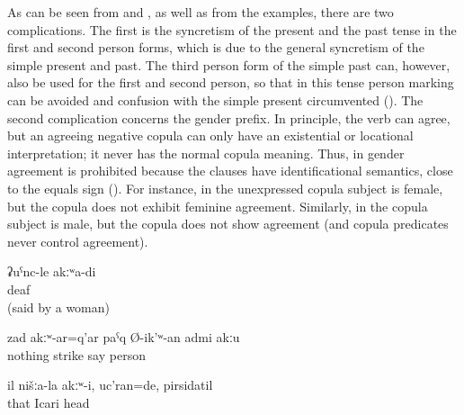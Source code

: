 As can be seen from  and , as well as from the examples, there are two complications. The first is the syncretism of the present and the past tense in the first and second person forms, which is due to the general syncretism of the simple present and past. The third person form of the simple past can, however, also be used for the first and second person, so that in this tense person marking can be avoided and confusion with the simple present circumvented (). The second complication concerns the gender prefix. In principle, the verb can agree, but an agreeing negative copula can only have an existential or locational interpretation; it never has the normal copula meaning. Thus, in  gender agreement is prohibited because the clauses have identificational semantics, close to the equals sign (\tit{=}). For instance, in  the unexpressed copula subject is female, but the copula does not exhibit feminine agreement. Similarly, in  the copula subject is male, but the copula does not show agreement (and copula predicates never control agreement).
%
\begin{exe}
	\ex	\label{ex:I am not deaf}
	\gll	ʡuˁnc-le	akːʷa-di\\
		deaf	\\
	\glt	{} (said by a woman)

	\ex	\label{ex:He is not the person who beats without anything}
	\gll	zad	akːʷ-ar=q'ar	paˁq	Ø-ik'ʷ-an	admi	akːu\\
		nothing		strike	say	person	\\
	\glt	{}

	\ex	\label{ex:He was not one of us, he was Icari, the head (of the kolkhoz)}
	\gll	il	nišːa-la	akːʷ-i,		uc'ran=de,	pirsidatil\\
		that				Icari	head\\
	\glt	{}
\end{exe}

